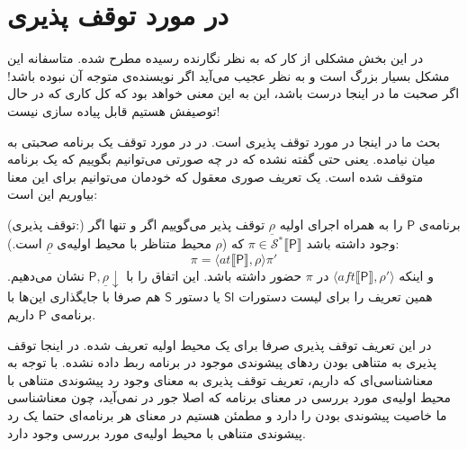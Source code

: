 \section{در مورد توقف پذیری}

در این بخش مشکلی از کار که به نظر نگارنده رسیده مطرح شده. متاسفانه این مشکل بسیار بزرگ است و به نظر عجیب می‌‌آید اگر نویسنده‌ی \cite{calcul} متوجه آن نبوده باشد! اگر صحبت ما در اینجا درست باشد، این به این معنی خواهد بود که کل کاری که در حال توصیفش هستیم قابل پیاده سازی نیست!

بحث ما در اینجا در مورد توقف پذیری است. در \cite{calcul} در مورد توقف یک برنامه صحبتی به میان نیامده. یعنی حتی گفته نشده که در چه صورتی می‌توانیم بگوییم که یک برنامه متوقف شده است. یک تعریف  صوری معقول که خودمان می‌توانیم برای این معنا بیاوریم این است:

\begin{defn}
(توقف پذیری:) برنامه‌ی $\mathsf{P}$ را به همراه اجرای اولیه $\underline{\rho}$ توقف پذیر می‌گوییم اگر و تنها اگر وجود داشته باشد 
	$\pi \in \mathcal{S}^* \llbracket \mathsf{P} \rrbracket$ 
	که ($\rho$ محیط متناظر با محیط اولیه‌ی $\underline{\rho}$ است.):
	$$\pi = \langle at \llbracket \mathsf{P} \rrbracket , \rho \rangle \pi'$$
	و اینکه $\langle aft\llbracket \mathsf{P} \rrbracket , \rho' \rangle$ در $\pi$ حضور داشته باشد. این اتفاق را با 
	$\mathsf{P,\underline{\rho}\downarrow}$
	نشان می‌دهیم. همین تعریف را برای لیست دستورات $\mathsf{Sl}$ یا دستور $\mathsf{S}$ هم صرفا با جایگذاری این‌ها با برنامه‌ی $\mathsf{P}$ داریم.
\end{defn} 
در این تعریف توقف پذیری صرفا برای یک محیط اولیه تعریف شده.
در اینجا توقف پذیری به متناهی بودن ردهای پیشوندی موجود در برنامه ربط داده نشده. با توجه به معناشناسی‌ای که داریم، تعریف توقف پذیری به معنای وجود رد پیشوندی متناهی با محیط اولیه‌ی مورد بررسی در معنای برنامه که اصلا جور در نمی‌آید، چون معناشناسی ما خاصیت پیشوندی بودن را دارد و مطمئن هستیم در معنای هر برنامه‌ای حتما یک رد پیشوندی متناهی با محیط اولیه‌ی مورد بررسی وجود دارد.

